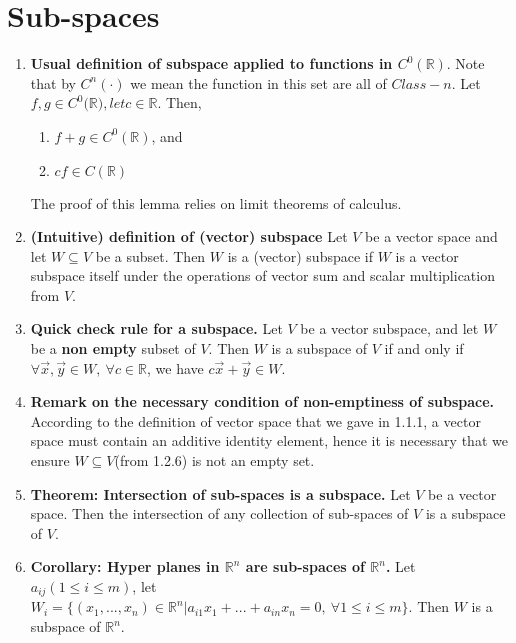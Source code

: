 \documentclass[oneside, 12pt]{book}
\newcommand{\settag}[1]{\renewcommand{\theenumi}{#1}}
\newcommand{\R}{\mathbb{R}}
\begin{document}
\section{Sub-spaces}
    \begin{enumerate}
        \settag{1.2.4}
        \item \textbf{Usual definition of subspace applied to functions in $C^0(\mathbb{R})$}. Note that by $C^n(\cdot)$ we mean the function in this set are all of $Class-n$. Let $f,g \in C^0(\mathbb{R)}, let c\in \mathbb{R}$. Then, 
        \begin{enumerate}
            \item $f+g\in C^0(\R)$, and
            \item $cf \in C(\R)$
        \end{enumerate}
        The proof of this lemma relies on limit theorems of calculus.
        
        \settag{1.2.6}
        \item \textbf{(Intuitive) definition of (vector) subspace} Let $V$ be a vector space and let $W\subseteq V$ be a subset. Then $W$ is a (vector) subspace if $W$ is a vector subspace itself under the operations of vector sum and scalar multiplication from $V$.
        
        \settag{1.2.8}
        \item \textbf{Quick check rule for a subspace.} Let $V$ be a vector subspace, and let $W$ be a \textbf{non empty} subset of $V$. Then $W$ is a subspace of $V$ if and only if $\forall \vec{x}, \vec{y}\in W,~\forall c\in \R$, we have $c\vec{x}+\vec{y}\in W$.
        \settag{1.2.9}
        \item \textbf{Remark on the necessary condition of non-emptiness of subspace.} According to the definition of vector space that we gave in 1.1.1, a vector space must contain an additive identity element, hence it is necessary that we ensure $W\subseteq V$(from 1.2.6) is not an empty set.
        
        \settag{1.2.13}
        \item \textbf{Theorem: Intersection of sub-spaces is a subspace.} Let $V$ be a vector space. Then the intersection of any collection of sub-spaces of $V$ is a subspace of $V$.
        
        \settag{1.2.14}
        \item \textbf{Corollary: Hyper planes in $\R^n$ are sub-spaces of $\R^n$.} Let $a_{ij}(1\leq i\leq m)$, let $W_i = \{(x_1, ..., x_n)\in \R^n|a_{i1}x_1 + ... + a_{in}x_n = 0,~\forall 1 \leq i \leq m\}$. Then $W$ is a subspace of $\R^n$.
        
    \end{enumerate}
    
\end{document}
